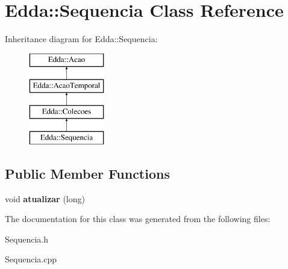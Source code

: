 \hypertarget{class_edda_1_1_sequencia}{
\section{Edda::Sequencia Class Reference}
\label{class_edda_1_1_sequencia}
}
Inheritance diagram for Edda::Sequencia:\begin{figure}[H]
\begin{center}
\leavevmode
\includegraphics[height=4.000000cm]{class_edda_1_1_sequencia}
\end{center}
\end{figure}
\subsection*{Public Member Functions}
\begin{DoxyCompactItemize}
\item 
\hypertarget{class_edda_1_1_sequencia_a9b5257bbcd2d112c2b2b55fa69a23a34}{
void {\bfseries atualizar} (long)}
\label{class_edda_1_1_sequencia_a9b5257bbcd2d112c2b2b55fa69a23a34}

\end{DoxyCompactItemize}


The documentation for this class was generated from the following files:\begin{DoxyCompactItemize}
\item 
Sequencia.h\item 
Sequencia.cpp\end{DoxyCompactItemize}
